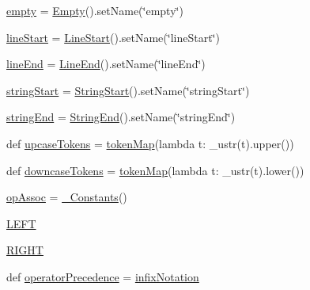 \begin{DoxyCompactItemize}
\item 
\hyperlink{namespacesetuptools_1_1__vendor_1_1pyparsing_a39472df23138c521b99ffee9980929d0}{empty} = \hyperlink{classsetuptools_1_1__vendor_1_1pyparsing_1_1_empty}{Empty}().set\+Name(\char`\"{}empty\char`\"{})
\item 
\hyperlink{namespacesetuptools_1_1__vendor_1_1pyparsing_a20f38fc35adca2a696a4caf570eac957}{line\+Start} = \hyperlink{classsetuptools_1_1__vendor_1_1pyparsing_1_1_line_start}{Line\+Start}().set\+Name(\char`\"{}line\+Start\char`\"{})
\item 
\hyperlink{namespacesetuptools_1_1__vendor_1_1pyparsing_ae562e1839478f02800f3ce484d3daade}{line\+End} = \hyperlink{classsetuptools_1_1__vendor_1_1pyparsing_1_1_line_end}{Line\+End}().set\+Name(\char`\"{}line\+End\char`\"{})
\item 
\hyperlink{namespacesetuptools_1_1__vendor_1_1pyparsing_ac12a53057f66eba93b6b0264d66250ef}{string\+Start} = \hyperlink{classsetuptools_1_1__vendor_1_1pyparsing_1_1_string_start}{String\+Start}().set\+Name(\char`\"{}string\+Start\char`\"{})
\item 
\hyperlink{namespacesetuptools_1_1__vendor_1_1pyparsing_a5d4e66b32b58b7ea11a211ab0b56df42}{string\+End} = \hyperlink{classsetuptools_1_1__vendor_1_1pyparsing_1_1_string_end}{String\+End}().set\+Name(\char`\"{}string\+End\char`\"{})
\item 
def \hyperlink{namespacesetuptools_1_1__vendor_1_1pyparsing_a9c65499f07d8593273a03109246a0065}{upcase\+Tokens} = \hyperlink{namespacesetuptools_1_1__vendor_1_1pyparsing_ab23a263ffde8e7245ed6b5d2c76f930d}{token\+Map}(lambda t\+: \+\_\+ustr(t).upper())
\item 
def \hyperlink{namespacesetuptools_1_1__vendor_1_1pyparsing_ad268c0b255ad76103ec50eb8ab39ea33}{downcase\+Tokens} = \hyperlink{namespacesetuptools_1_1__vendor_1_1pyparsing_ab23a263ffde8e7245ed6b5d2c76f930d}{token\+Map}(lambda t\+: \+\_\+ustr(t).lower())
\item 
\hyperlink{namespacesetuptools_1_1__vendor_1_1pyparsing_a56e25197394f4b41db0fba24418b32d4}{op\+Assoc} = \hyperlink{classsetuptools_1_1__vendor_1_1pyparsing_1_1___constants}{\+\_\+\+Constants}()
\item 
\hyperlink{namespacesetuptools_1_1__vendor_1_1pyparsing_a61425e1af3efc00847e9dfc64b7680e7}{L\+E\+FT}
\item 
\hyperlink{namespacesetuptools_1_1__vendor_1_1pyparsing_a31b90bb31de6b67285a3aeb071c5d12b}{R\+I\+G\+HT}
\item 
def \hyperlink{namespacesetuptools_1_1__vendor_1_1pyparsing_a7a5eebe4b763fe7b6a0b8ccde4755261}{operator\+Precedence} = \hyperlink{namespacesetuptools_1_1__vendor_1_1pyparsing_a929a2b2bcc0fb4b63624e72f021cc266}{infix\+Notation}

\end{DoxyCompactItemize}

